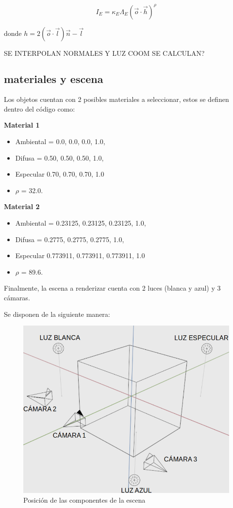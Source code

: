 \documentclass[12pt]{article}
\begin{document}
\begin{equation}
I_{E}=\kappa_{E}\Lambda_{E}(\vec{o} \cdot \vec{h})^{\rho}
\end{equation}


donde $h=2(\vec{o} \cdot \vec{l})\vec{n}-\vec{l}$

SE INTERPOLAN NORMALES Y LUZ COOM SE CALCULAN?


\subsection{materiales y escena}
Los objetos cuentan con 2 posibles materiales a seleccionar, estos se definen dentro del código como:

\textbf{Material 1}
\begin{itemize}
\item Ambiental = {0.0, 0.0, 0.0, 1.0},
\item Difusa = {0.50, 0.50, 0.50, 1.0},
\item Especular {0.70, 0.70, 0.70, 1.0} 
\item $\rho$ = 32.0.
\end{itemize}


\textbf{Material 2}
\begin{itemize}
\item Ambiental = {0.23125, 0.23125, 0.23125, 1.0},
\item Difusa = {0.2775, 0.2775, 0.2775, 1.0},
\item Especular {0.773911, 0.773911, 0.773911, 1.0}
\item $\rho$ = 89.6.
\end{itemize}


Finalmente, la escena a renderizar cuenta con 2 luces (blanca y azul) y 3 cámaras.

Se disponen de la siguiente manera: 


\begin{figure}[H]
\centering
\includegraphics[scale=0.3]{images/ESCENAA.png}
\caption{Posición de las componentes de la escena}
\end{figure}
\end{document}
